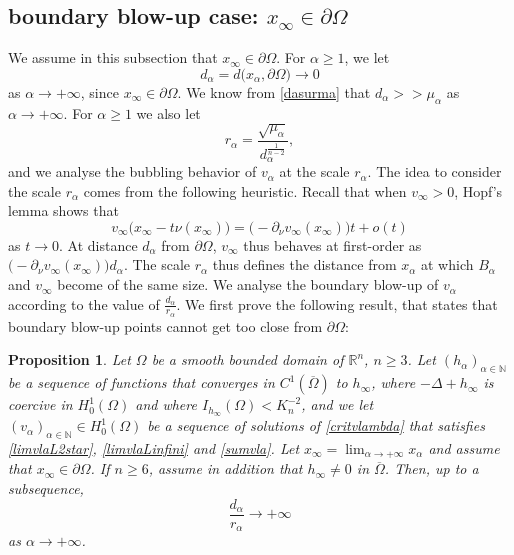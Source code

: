 \documentclass[10pt]{amsart}
\numberwithin{equation}{section}
\newcommand{\Om}{\Omega}
\newcommand{\ma}{\mu_\alpha}
\def \rr {\mathbb{R}}
\def\la{\alpha}
\def \ma{\mu_{\alpha}}
\def \va{v_{\alpha}}
\def \ha{h_{\alpha}}
\def \hi{h_{\infty}}
\def \nn{\mathbb{N}}
\theoremstyle{plain}
\newtheorem{prop}{Proposition}[section]%
\theoremstyle{remark}
\begin{document}
\subsection{boundary blow-up case: $x_\infty \in \partial \Om$} We assume in this subsection that $x_\infty \in \partial\Om$. For $\alpha \ge 1$, we let
\begin{equation} \label{def:da}
 d_\alpha = d\big(x_\alpha, \partial \Om \big) \to 0 
 \end{equation}
as $\alpha \to +\infty$, since $x_\infty \in \partial \Om$. We know from \eqref{dasurma} that $d_\alpha >> \ma$ as $\alpha \to + \infty$.  For $\alpha \ge 1$ we also let 
\begin{equation}\label{ra}
r_{\la}=\frac{\sqrt{\ma}}{d_{\la}^{\frac{1}{n-2}}},
\end{equation}
and we analyse the bubbling behavior of $v_\alpha$ at the scale $r_\alpha$.  The idea to consider the scale $r_\alpha$ comes from the following heuristic. Recall that when $v_\infty >0$, Hopf's lemma shows that 
$$v_\infty \big(x_\infty - t \nu(x_\infty) \big) = \big( -\partial_{\nu} v_\infty(x_\infty) \big) t + o(t)$$ 
as $t\to 0$. At distance $d_\alpha$ from $\partial \Om$, $v_\infty$ thus behaves at first-order as $\big( -\partial_{\nu} v_\infty(x_\infty) \big) d_\alpha $. The scale $r_\alpha$ thus defines the distance from $x_\alpha$ at which $B_\alpha$ and $v_\infty$ become of the same size. We analyse the boundary blow-up of $v_\alpha$ according to the value of $\frac{d_\alpha}{r_\alpha}$. We first prove the following result, that states that boundary blow-up points cannot get too close from $\partial \Om$:

\begin{prop} \label{prop:blowup:bord}
Let $\Om$ be a smooth bounded domain of $\rr^n$, $n\geq 3$. Let $(\ha)_{\alpha\in\nn}$ be a sequence of functions that converges in $C^{1}(\overline{\Om})$ to $\hi$, where $-\Delta+\hi$ is coercive in $H^1_0(\Om)$ and where $I_{\hi}(\Om)<K_{n}^{-2}$, and we let $(\va)_{\alpha\in\nn}\in H_0^1(\Om)$ be a sequence of solutions of \eqref{critvlambda} that satisfies \eqref{limvlaL2star}, \eqref{limvlaLinfini} and \eqref{sumvla}. Let $x_\infty = \lim_{\alpha \to + \infty} x_\alpha$ and assume that $x_\infty \in \partial \Om$. If $n \ge 6$, assume in addition that $\hi \neq 0$ in $\overline{\Omega}$. Then, up to a subsequence,
$$ \frac{d_{\alpha}}{r_\alpha}  \to + \infty  $$
as $\alpha \to + \infty$. 
\end{prop}
\end{document}
